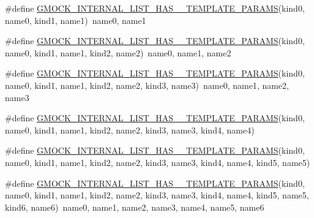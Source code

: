 \begin{DoxyCompactItemize}
\item 
\#define \mbox{\hyperlink{_obj__test_2lib_2googletest-release-1_88_81_2googlemock_2include_2gmock_2gmock-generated-actions_8h_ab89cb2aad7a5ededf9397ffd58fb8a9a}{G\+M\+O\+C\+K\+\_\+\+I\+N\+T\+E\+R\+N\+A\+L\+\_\+\+L\+I\+S\+T\+\_\+\+H\+A\+S\+\_\+\_\+\+T\+E\+M\+P\+L\+A\+T\+E\+\_\+\+P\+A\+R\+A\+MS}}(kind0,  name0,  kind1,  name1)~name0, name1
\item 
\#define \mbox{\hyperlink{_obj__test_2lib_2googletest-release-1_88_81_2googlemock_2include_2gmock_2gmock-generated-actions_8h_a1f3bd0693e586000f0b8a5324183b47f}{G\+M\+O\+C\+K\+\_\+\+I\+N\+T\+E\+R\+N\+A\+L\+\_\+\+L\+I\+S\+T\+\_\+\+H\+A\+S\+\_\+\_\+\+T\+E\+M\+P\+L\+A\+T\+E\+\_\+\+P\+A\+R\+A\+MS}}(kind0,  name0,  kind1,  name1,  kind2,  name2)~name0, name1, name2
\item 
\#define \mbox{\hyperlink{_obj__test_2lib_2googletest-release-1_88_81_2googlemock_2include_2gmock_2gmock-generated-actions_8h_a6b509ec43356784c0bb70056dcd2c5a2}{G\+M\+O\+C\+K\+\_\+\+I\+N\+T\+E\+R\+N\+A\+L\+\_\+\+L\+I\+S\+T\+\_\+\+H\+A\+S\+\_\+\_\+\+T\+E\+M\+P\+L\+A\+T\+E\+\_\+\+P\+A\+R\+A\+MS}}(kind0,  name0,  kind1,  name1,  kind2,  name2,  kind3,  name3)~name0, name1, name2, name3
\item 
\#define \mbox{\hyperlink{_obj__test_2lib_2googletest-release-1_88_81_2googlemock_2include_2gmock_2gmock-generated-actions_8h_ad9010efd4cfd9c4874d18fef3aee7676}{G\+M\+O\+C\+K\+\_\+\+I\+N\+T\+E\+R\+N\+A\+L\+\_\+\+L\+I\+S\+T\+\_\+\+H\+A\+S\+\_\+\_\+\+T\+E\+M\+P\+L\+A\+T\+E\+\_\+\+P\+A\+R\+A\+MS}}(kind0,  name0,  kind1,  name1,  kind2,  name2,  kind3,  name3,  kind4,  name4)
\item 
\#define \mbox{\hyperlink{_obj__test_2lib_2googletest-release-1_88_81_2googlemock_2include_2gmock_2gmock-generated-actions_8h_ae9d4c983c2aba6b0fa5725118bb11cbd}{G\+M\+O\+C\+K\+\_\+\+I\+N\+T\+E\+R\+N\+A\+L\+\_\+\+L\+I\+S\+T\+\_\+\+H\+A\+S\+\_\+\_\+\+T\+E\+M\+P\+L\+A\+T\+E\+\_\+\+P\+A\+R\+A\+MS}}(kind0,  name0,  kind1,  name1,  kind2,  name2,  kind3,  name3,  kind4,  name4,  kind5,  name5)
\item 
\#define \mbox{\hyperlink{_obj__test_2lib_2googletest-release-1_88_81_2googlemock_2include_2gmock_2gmock-generated-actions_8h_ad76d91a49b437e52790b3d7efeb6f289}{G\+M\+O\+C\+K\+\_\+\+I\+N\+T\+E\+R\+N\+A\+L\+\_\+\+L\+I\+S\+T\+\_\+\+H\+A\+S\+\_\+\_\+\+T\+E\+M\+P\+L\+A\+T\+E\+\_\+\+P\+A\+R\+A\+MS}}(kind0,  name0,  kind1,  name1,  kind2,  name2,  kind3,  name3,  kind4,  name4,  kind5,  name5,  kind6,  name6)~name0, name1, name2, name3, name4, name5, name6

\end{DoxyCompactItemize}
